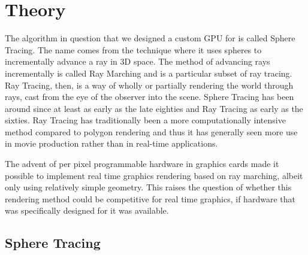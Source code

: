 \chapter{Theory}


	The algorithm in question that we designed a custom GPU for is called
	Sphere Tracing\cite{Hart1996}. The name comes from the technique where it uses spheres to
	incrementally advance a ray in 3D space. The method of advancing rays
	incrementally is called Ray Marching and is a particular subset of ray
	tracing.\cite{Whitted1980} Ray Tracing, then, is a way of wholly or
	partially rendering the world through rays, cast from the eye of the
	observer into the scene. Sphere Tracing has been around since at least as
	early as the late eighties and Ray Tracing as early as the
	sixties\cite{Hart1989,Appel1968}. Ray Tracing has traditionally been a 
	more computationally intensive method compared to polygon
	rendering\cite{Wylie1967} and thus it has generally seen more use in movie  
	production rather than in real-time applications.\cite{ref_needed?} 
	
	The advent of per pixel programmable hardware in graphics cards made it 
	possible to implement real time graphics rendering based on ray	marching, 
	albeit only using relatively simple geometry. This raises the question of 
	whether this rendering method could be competitive for real time graphics, 
	if hardware that was specifically designed for it was available.
	
		
	\section{Sphere Tracing} 

